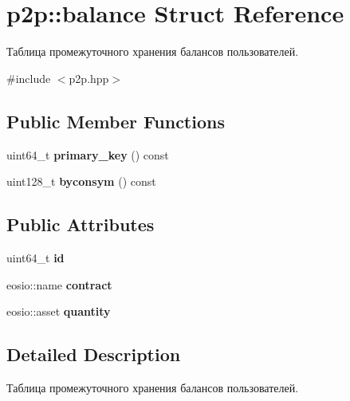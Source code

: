 \hypertarget{structp2p_1_1balance}{}\section{p2p\+:\+:balance Struct Reference}
\label{structp2p_1_1balance}


Таблица промежуточного хранения балансов пользователей.  




{\ttfamily \#include $<$p2p.\+hpp$>$}

\subsection*{Public Member Functions}
\begin{DoxyCompactItemize}
\item 
\mbox{\label{structp2p_1_1balance_ae23379e6dde9970bcc5a54e4e590da63}} 
uint64\+\_\+t {\bfseries primary\+\_\+key} () const
\item 
\mbox{\label{structp2p_1_1balance_a156c77b56c8c0bd71d769fd3281bdf11}} 
uint128\+\_\+t {\bfseries byconsym} () const
\end{DoxyCompactItemize}
\subsection*{Public Attributes}
\begin{DoxyCompactItemize}
\item 
\mbox{\label{structp2p_1_1balance_a64daf2f578332cd8011c70cfa8683589}} 
uint64\+\_\+t {\bfseries id}
\item 
\mbox{\label{structp2p_1_1balance_ae764a6535e50b4f284d7c6e080376a73}} 
eosio\+::name {\bfseries contract}
\item 
\mbox{\label{structp2p_1_1balance_aed079d7e8d81efd98a65fd0703184883}} 
eosio\+::asset {\bfseries quantity}
\end{DoxyCompactItemize}


\subsection{Detailed Description}
Таблица промежуточного хранения балансов пользователей. 

